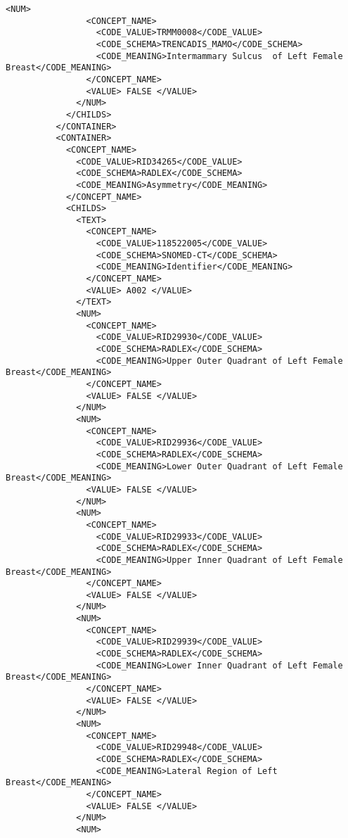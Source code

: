 \begin{lstlisting}[label=dicom-report,caption=Informe estructurado de una exploración de mama]
              <NUM>
                <CONCEPT_NAME>
                  <CODE_VALUE>TRMM0008</CODE_VALUE>
                  <CODE_SCHEMA>TRENCADIS_MAMO</CODE_SCHEMA>
                  <CODE_MEANING>Intermammary Sulcus  of Left Female Breast</CODE_MEANING>
                </CONCEPT_NAME>
                <VALUE> FALSE </VALUE>
              </NUM>
            </CHILDS>
          </CONTAINER>
          <CONTAINER>
            <CONCEPT_NAME>
              <CODE_VALUE>RID34265</CODE_VALUE>
              <CODE_SCHEMA>RADLEX</CODE_SCHEMA>
              <CODE_MEANING>Asymmetry</CODE_MEANING>
            </CONCEPT_NAME>
            <CHILDS>
              <TEXT>
                <CONCEPT_NAME>
                  <CODE_VALUE>118522005</CODE_VALUE>
                  <CODE_SCHEMA>SNOMED-CT</CODE_SCHEMA>
                  <CODE_MEANING>Identifier</CODE_MEANING>
                </CONCEPT_NAME>
                <VALUE> A002 </VALUE>
              </TEXT>
              <NUM>
                <CONCEPT_NAME>
                  <CODE_VALUE>RID29930</CODE_VALUE>
                  <CODE_SCHEMA>RADLEX</CODE_SCHEMA>
                  <CODE_MEANING>Upper Outer Quadrant of Left Female Breast</CODE_MEANING>
                </CONCEPT_NAME>
                <VALUE> FALSE </VALUE>
              </NUM>
              <NUM>
                <CONCEPT_NAME>
                  <CODE_VALUE>RID29936</CODE_VALUE>
                  <CODE_SCHEMA>RADLEX</CODE_SCHEMA>
                  <CODE_MEANING>Lower Outer Quadrant of Left Female Breast</CODE_MEANING>
                <VALUE> FALSE </VALUE>
              </NUM>
              <NUM>
                <CONCEPT_NAME>
                  <CODE_VALUE>RID29933</CODE_VALUE>
                  <CODE_SCHEMA>RADLEX</CODE_SCHEMA>
                  <CODE_MEANING>Upper Inner Quadrant of Left Female Breast</CODE_MEANING>
                </CONCEPT_NAME>
                <VALUE> FALSE </VALUE>
              </NUM>
              <NUM>
                <CONCEPT_NAME>
                  <CODE_VALUE>RID29939</CODE_VALUE>
                  <CODE_SCHEMA>RADLEX</CODE_SCHEMA>
                  <CODE_MEANING>Lower Inner Quadrant of Left Female Breast</CODE_MEANING>
                </CONCEPT_NAME>
                <VALUE> FALSE </VALUE>
              </NUM>
              <NUM>
                <CONCEPT_NAME>
                  <CODE_VALUE>RID29948</CODE_VALUE>
                  <CODE_SCHEMA>RADLEX</CODE_SCHEMA>
                  <CODE_MEANING>Lateral Region of Left Breast</CODE_MEANING>
                </CONCEPT_NAME>
                <VALUE> FALSE </VALUE>
              </NUM>
              <NUM>

\end{lstlisting}
